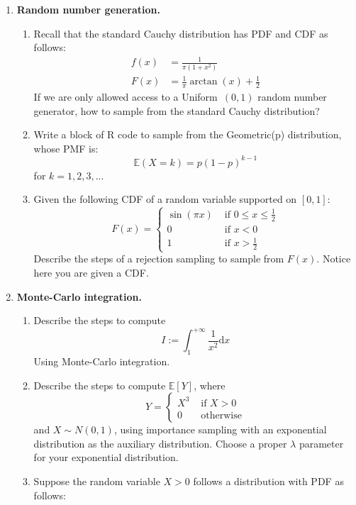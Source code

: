 \documentclass[11pt]{article}
\newcommand{\ep}{\mathbb{E}}
\newcommand{\td}{\textrm{d}}
\begin{document}
\begin{enumerate}
\begin{enumerate}
	\end{enumerate}
	\item {\bf Random number generation.}
	\begin{enumerate}
		\item\label{Cauchy} Recall that the standard Cauchy distribution has PDF and CDF as follows:
		\begin{align*}
			f(x) &= \frac{1}{\pi(1+x^2)}\\
			F(x) &= \frac{1}{\pi}\arctan(x)+\frac{1}{2}
		\end{align*}
		If we are only allowed access to a Uniform~$(0, 1)$ random number generator, how to sample from the standard Cauchy distribution?
		\item Write a block of R code to sample from the Geometric(p) distribution, whose PMF is:
		$$
			\ep(X=k) = p(1-p)^{k-1}
		$$
		for $k=1,2,3,...$
		\item Given the following CDF of a random variable supported on $[0, 1]$:
		$$
		F(x)=\begin{cases}
		\sin(\pi x) & \textrm{ if } 0\leq x\leq \frac{1}{2}\\
		0			& \textrm{ if } x<0\\
		1			& \textrm{ if } x>\frac{1}{2}
		\end{cases}
		$$
		Describe the steps of a rejection sampling to sample from $F(x)$. Notice here you are given a CDF.
	\end{enumerate}
	\item {\bf Monte-Carlo integration.}
	\begin{enumerate}
		\item Describe the steps to compute
		$$
			I:=\int_1^{+\infty} \frac{1}{x^2}\td x
		$$
		Using Monte-Carlo integration.
		\item Describe the steps to compute $\ep[Y]$, where
		$$
			Y=\begin{cases}
				X^3 & \textrm{ if } X>0\\
				0 & \textrm{ otherwise}
			\end{cases}
		$$
		and $X\sim N(0, 1)$, using importance sampling with an exponential distribution as the auxiliary distribution. Choose a proper $\lambda$ parameter for your exponential distribution. 
		\item Suppose the random variable $X>0$ follows a distribution with PDF as follows:

\end{enumerate}
\end{enumerate}
\end{document}
